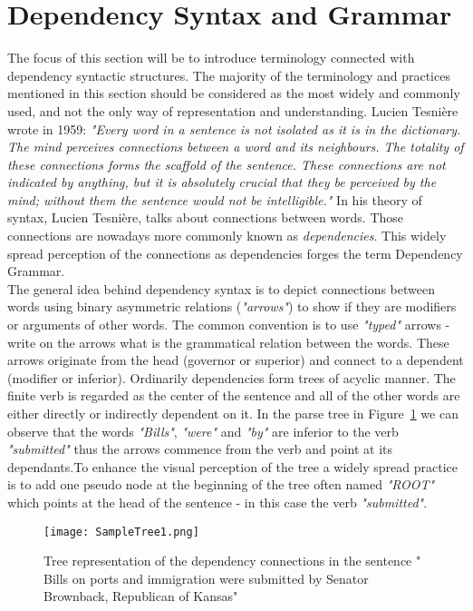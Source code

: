 \documentclass[bsc,frontabs,twoside,singlespacing,parskip,deptrepor]{infthesis}
\begin{document}
\section{Dependency Syntax and Grammar}
The focus of this section will be to introduce terminology connected with dependency syntactic structures. The majority of the terminology and practices mentioned in this section should be considered as the most widely and commonly used, and not the only way of representation and understanding.
Lucien Tesnière wrote in 1959: \textit{"Every word in a sentence is not isolated as it is in the dictionary. The mind perceives connections between a word and its neighbours. The totality of these connections forms the scaffold of the sentence. These connections are not indicated by anything, but it is absolutely crucial that they be perceived by the mind; without them the sentence would not be intelligible."}\cite{P3} In his theory of syntax, Lucien Tesnière, talks about connections between words. Those connections are nowadays more commonly known as \textit{dependencies}. This widely spread perception of the connections as dependencies forges the term Dependency Grammar.
\\The general idea behind dependency syntax is to depict connections between words using binary asymmetric relations (\textit{"arrows"}) to show if they are modifiers or arguments of other words. The common convention is to use \textit{"typed"} arrows - write on the arrows what is the grammatical relation between the words. These arrows originate from the head (governor or superior) and connect to a dependent (modifier or inferior). Ordinarily dependencies form trees of acyclic manner. The finite verb is regarded as the center of the sentence and all of the other words are either directly or indirectly dependent on it. In the parse tree in Figure~\ref{fig:bills_tree} we can observe that the words \textit{"Bills"}, \textit{"were"} and \textit{"by"} are inferior to the verb \textit{"submitted"} thus the arrows commence from the verb and point at its dependants.To enhance the visual perception of the tree a widely spread practice is to add one pseudo node at the beginning of the tree often named \textit{"ROOT"} which points at the head of the sentence - in this case the verb \textit{"submitted"}.

\begin{figure}[H]
\centering
\texttt{[image: SampleTree1.png]}
\caption{Tree representation of the dependency connections in the sentence " Bills on ports and immigration were submitted by Senator Brownback, Republican of Kansas" \cite{P4}}
\label{fig:bills_tree}
\end{figure}
\end{document}
